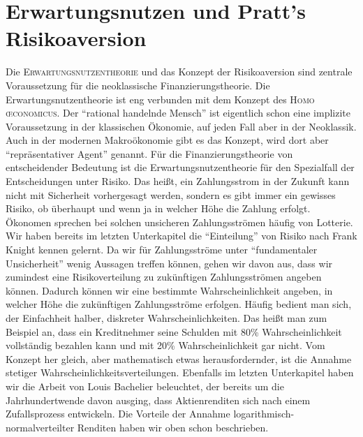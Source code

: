 \section{Erwartungsnutzen und Pratt's Risikoaversion}
\label{Erwartungsnutzen}
Die \textsc{Erwartungsnutzentheorie} und das Konzept der Risikoaversion sind zentrale Voraussetzung für die neoklassische Finanzierungstheorie. Die Erwartungsnutzentheorie ist eng verbunden mit dem Konzept des \textsc{Homo \oe conomicus}. Der "`rational handelnde Mensch"' ist eigentlich schon eine implizite Voraussetzung in der klassischen Ökonomie, auf jeden Fall aber in der Neoklassik. Auch in der modernen Makroökonomie gibt es das Konzept, wird dort aber "`repräsentativer Agent"' genannt. Für die Finanzierungstheorie von entscheidender Bedeutung ist die Erwartungsnutzentheorie für den Spezialfall der Entscheidungen unter Risiko. Das heißt, ein Zahlungsstrom in der Zukunft kann nicht mit Sicherheit vorhergesagt werden, sondern es gibt immer ein gewisses Risiko, ob überhaupt und wenn ja in welcher Höhe die Zahlung erfolgt. Ökonomen sprechen bei solchen unsicheren Zahlungsströmen häufig von Lotterie. Wir haben bereits im letzten Unterkapitel die "`Einteilung"' von Risiko nach Frank Knight kennen gelernt. Da wir für Zahlungsströme unter "`fundamentaler Unsicherheit"' wenig Aussagen treffen können, gehen wir davon aus, dass wir zumindest eine Risikoverteilung zu zukünftigen Zahlungsströmen angeben können. Dadurch können wir eine bestimmte Wahrscheinlichkeit angeben, in welcher Höhe die zukünftigen Zahlungsströme erfolgen. Häufig bedient man sich, der Einfachheit halber, diskreter Wahrscheinlichkeiten. Das heißt man zum Beispiel an, dass ein Kreditnehmer seine Schulden mit 80\% Wahrscheinlichkeit vollständig bezahlen kann und mit 20\% Wahrscheinlichkeit gar nicht. Vom Konzept her gleich, aber mathematisch etwas herausfordernder, ist die Annahme stetiger Wahrscheinlichkeitsverteilungen. Ebenfalls im letzten Unterkapitel haben wir die Arbeit von Louis Bachelier beleuchtet, der bereits um die Jahrhundertwende davon ausging, dass Aktienrenditen sich nach einem Zufallsprozess entwickeln. Die Vorteile der Annahme logarithmisch-normalverteilter Renditen haben wir oben schon beschrieben. 

